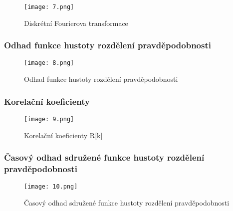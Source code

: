 \documentclass[a4paper,10pt]{article}
\begin{document}
\begin{multicols}{2}
\begin{figure}[H]
	\centering
	\texttt{[image: 7.png]}
	\caption{Diskrétní Fourierova transformace}
	\label{fig:obr7}
\end{figure}

\subsubsection*{Odhad funkce hustoty rozdělení pravděpodobnosti}

\begin{figure}[H]
	\centering
	\texttt{[image: 8.png]}
	\caption{Odhad funkce hustoty rozdělení pravděpodobnosti}
	\label{fig:obr8}
\end{figure}

\subsubsection*{Korelační koeficienty}

\begin{figure}[H]
	\centering
	\texttt{[image: 9.png]}
	\caption{Korelační koeficienty R[k]}
	\label{fig:obr9}
\end{figure}

\subsubsection*{Časový odhad sdružené funkce hustoty rozdělení pravděpodobnosti}

\begin{figure}[H]
	\centering
	\texttt{[image: 10.png]}
	\caption{Časový odhad sdružené funkce hustoty rozdělení pravděpodobnosti}
	\label{fig:obr10}
\end{figure}

\end{multicols}
\end{document}
